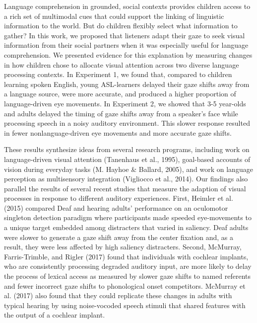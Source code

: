 \documentclass[,man,floatsintext]{apa6}
\begin{document}
Language comprehension in grounded, social contexts provides children
access to a rich set of multimodal cues that could support the linking
of linguistic information to the world. But do children flexibly select
what information to gather? In this work, we proposed that listeners
adapt their gaze to seek visual information from their social partners
when it was especially useful for language comprehension. We presented
evidence for this explanation by measuring changes in how children chose
to allocate visual attention across two diverse language processing
contexts. In Experiment 1, we found that, compared to children learning
spoken English, young ASL-learners delayed their gaze shifts away from a
language source, were more accurate, and produced a higher proportion of
language-driven eye movements. In Experiment 2, we showed that 3-5
year-olds and adults delayed the timing of gaze shifts away from a
speaker's face while processing speech in a noisy auditory environment.
This slower response resulted in fewer nonlanguage-driven eye movements
and more accurate gaze shifts.

These results synthesize ideas from several research programs, including
work on language-driven visual attention (Tanenhaus et al., 1995),
goal-based accounts of vision during everyday tasks (M. Hayhoe \&
Ballard, 2005), and work on language perception as multisensory
integration (Vigliocco et al., 2014). Our findings also parallel the
results of several recent studies that measure the adaption of visual
processes in response to different auditory experiences. First, Heimler
et al. (2015) compared Deaf and hearing adults' performance on an
oculomotor singleton detection paradigm where participants made speeded
eye-movements to a unique target embedded among distracters that varied
in saliency. Deaf adults were slower to generate a gaze shift away from
the center fixation and, as a result, they were less affected by high
saliency distracters. Second, McMurray, Farris-Trimble, and Rigler
(2017) found that individuals with cochlear implants, who are
consistently processing degraded auditory input, are more likely to
delay the process of lexical access as measured by slower gaze shifts to
named referents and fewer incorrect gaze shifts to phonological onset
competitors. McMurray et al. (2017) also found that they could replicate
these changes in adults with typical hearing by using noise-vocoded
speech stimuli that shared features with the output of a cochlear
implant.
\end{document}
